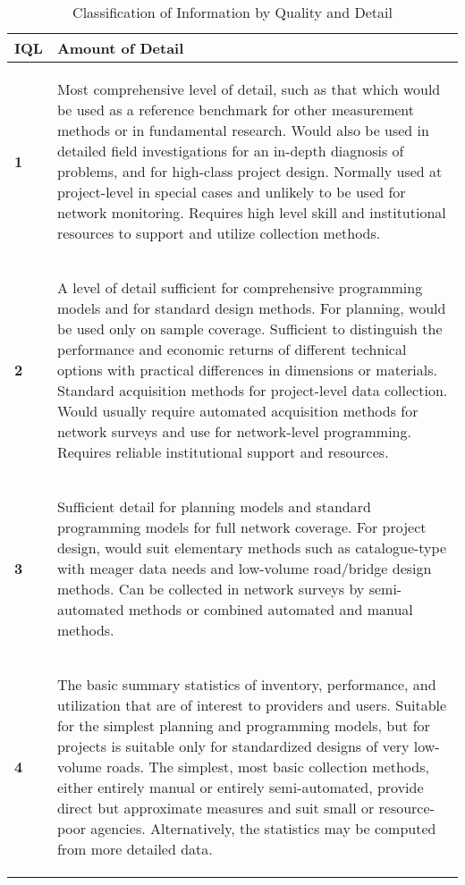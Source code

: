 \documentclass[tesi]{subfiles}
\begin{document}
\begin{table}[ht]\label{table:iql_detail}
\centering
    \begin{tabular}{ | l | p{15cm} |}

    \hline
    \textbf{IQL} & \hspace{5cm}
   \textbf{ Amount of Detail} \\ \hline


    \textbf{1} & \begin{footnotesize}
    Most comprehensive level of detail, such as that which would be used as a
reference benchmark for other measurement methods or in fundamental
research. Would also be used in detailed field investigations for an in-depth
diagnosis of problems, and for high-class project design. Normally used at
project-level in special cases and unlikely to be used for network monitoring.
Requires high level skill and institutional resources to support and utilize
collection methods.
    \end{footnotesize}\\
	\textbf{2} & \begin{footnotesize}
	A level of detail sufficient for comprehensive programming models and for
standard design methods. For planning, would be used only on sample coverage.
Sufficient to distinguish the performance and economic returns of different
technical options with practical differences in dimensions or materials. Standard
acquisition methods for project-level data collection. Would usually require
automated acquisition methods for network surveys and use for network-level
programming. Requires reliable institutional support and resources.
	\end{footnotesize} \\
	\textbf{3} &\begin{footnotesize}
	 Sufficient detail for planning models and standard programming models for full
network coverage. For project design, would suit elementary methods such as
catalogue-type with meager data needs and low-volume road/bridge design
methods. Can be collected in network surveys by semi-automated methods or
combined automated and manual methods.
	\end{footnotesize}\\
	\textbf{4} & \begin{footnotesize}
	The basic summary statistics of inventory, performance, and utilization that are
of interest to providers and users. Suitable for the simplest planning and
programming models, but for projects is suitable only for standardized designs of
very low-volume roads. The simplest, most basic collection methods, either
entirely manual or entirely semi-automated, provide direct but approximate
measures and suit small or resource-poor agencies. Alternatively, the statistics
may be computed from more detailed data.
	\end{footnotesize} \\


\hline
    \end{tabular}
 \caption{Classification of Information by Quality and Detail}
\end{table}
\clearpage
\end{document}
